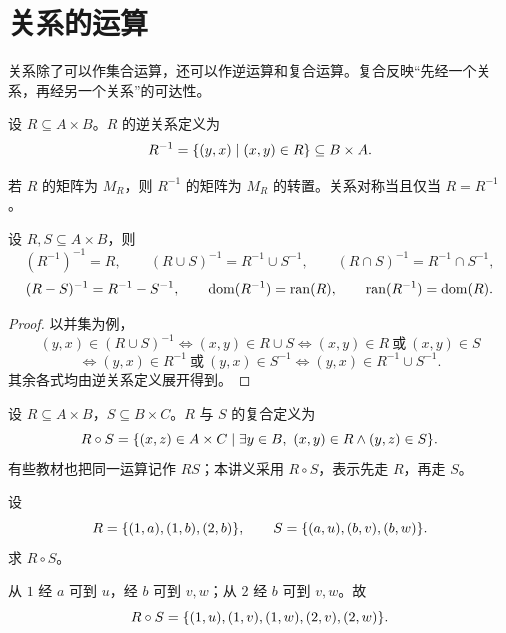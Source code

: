 \section{关系的运算}

关系除了可以作集合运算，还可以作逆运算和复合运算。复合反映“先经一个关系，再经另一个关系”的可达性。

\begin{definition}[逆关系]\label{ch2-inverse-relation}
设 $R\subseteq A\times B$。$R$ 的逆关系定义为
\[
  R^{-1}=\{(y,x)\mid (x,y)\in R\}\subseteq B\times A.
\]
\end{definition}

若 $R$ 的矩阵为 $M_R$，则 $R^{-1}$ 的矩阵为 $M_R$ 的转置。关系对称当且仅当 $R=R^{-1}$。

\begin{theorem}[逆关系的运算律]\label{ch2-inverse-laws}
设 $R,S\subseteq A\times B$，则
\[
  (R^{-1})^{-1}=R,\qquad
  (R\cup S)^{-1}=R^{-1}\cup S^{-1},\qquad
  (R\cap S)^{-1}=R^{-1}\cap S^{-1},
\]
\[
  (R-S)^{-1}=R^{-1}-S^{-1},\qquad
  \operatorname{dom}(R^{-1})=\operatorname{ran}(R),\qquad
  \operatorname{ran}(R^{-1})=\operatorname{dom}(R).
\]
\end{theorem}

\begin{proof}
以并集为例，
\[
(y,x)\in(R\cup S)^{-1}
\Longleftrightarrow (x,y)\in R\cup S
\Longleftrightarrow (x,y)\in R\ \text{或}\ (x,y)\in S
\]
\[
\Longleftrightarrow (y,x)\in R^{-1}\ \text{或}\ (y,x)\in S^{-1}
\Longleftrightarrow (y,x)\in R^{-1}\cup S^{-1}.
\]
其余各式均由逆关系定义展开得到。
\end{proof}

\begin{definition}[关系复合]\label{ch2-composition}
设 $R\subseteq A\times B$，$S\subseteq B\times C$。$R$ 与 $S$ 的复合定义为
\[
  R\circ S=\{(x,z)\in A\times C\mid \exists y\in B,\ (x,y)\in R\land(y,z)\in S\}.
\]
有些教材也把同一运算记作 $RS$；本讲义采用 $R\circ S$，表示先走 $R$，再走 $S$。
\end{definition}

\begin{example}[title={关系复合的计算}]\label{ch2-composition-example}
设
\[
R=\{(1,a),(1,b),(2,b)\},\qquad
S=\{(a,u),(b,v),(b,w)\}.
\]
求 $R\circ S$。
\begin{solution}
从 $1$ 经 $a$ 可到 $u$，经 $b$ 可到 $v,w$；从 $2$ 经 $b$ 可到 $v,w$。故
\[
  R\circ S=\{(1,u),(1,v),(1,w),(2,v),(2,w)\}.
\]
\end{solution}
\end{example}

